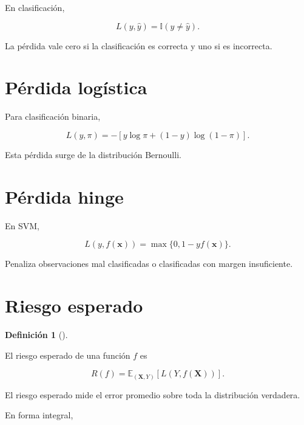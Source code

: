 \documentclass[
  spanish,
  10.5pt,
  letterpaper,
  DIV=11,
  numbers=noendperiod,
  oneside,
  open=any]{scrreprt}
\theoremstyle{definition}
\newtheorem{definition}{Definición}[chapter]
\theoremstyle{definition}
\theoremstyle{plain}
\theoremstyle{remark}
\begin{document}

En clasificación,

\[
L(y,\widehat{y})
=
\mathbb{I}(y\neq\widehat{y}).
\]

La pérdida vale cero si la clasificación es correcta y uno si es
incorrecta.

\section*{Pérdida logística}\label{puxe9rdida-loguxedstica-1}


Para clasificación binaria,

\[
L(y,\pi)
=
-
\left[
y\log\pi
+
(1-y)\log(1-\pi)
\right].
\]

Esta pérdida surge de la distribución Bernoulli.

\section*{Pérdida hinge}\label{puxe9rdida-hinge-1}


En SVM,

\[
L(y,f(\mathbf{x}))
=
\max
\{
0,
1-yf(\mathbf{x})
\}.
\]

Penaliza observaciones mal clasificadas o clasificadas con margen
insuficiente.

\section*{Riesgo esperado}\label{riesgo-esperado}


\begin{definition}[]\protect\hypertarget{def-riesgo-esperado}{}\label{def-riesgo-esperado}

El riesgo esperado de una función \(f\) es

\[
R(f)
=
\mathbb{E}_{(\mathbf{X},Y)}
\left[
L(
Y,
f(\mathbf{X})
)
\right].
\]

\end{definition}

El riesgo esperado mide el error promedio sobre toda la distribución
verdadera.

En forma integral,
\end{document}
